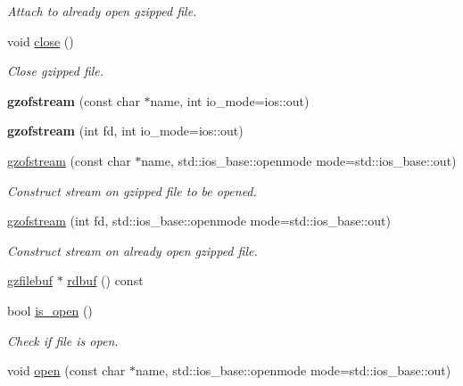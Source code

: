\begin{DoxyCompactItemize}
\begin{DoxyCompactList}\small\item\em Attach to already open gzipped file. \end{DoxyCompactList}\item 
void \hyperlink{classgzofstream_a59e8b01e1c9741085f18ca456c4b8f54}{close} ()
\begin{DoxyCompactList}\small\item\em Close gzipped file. \end{DoxyCompactList}\item 
\mbox{\label{classgzofstream_aad6a405bc9ecfd82cc0861a15e4a6983}} 
{\bfseries gzofstream} (const char $\ast$name, int io\+\_\+mode=ios\+::out)
\item 
\mbox{\label{classgzofstream_a5291a0c4c0e7f6f18ca72ae98f4e4d40}} 
{\bfseries gzofstream} (int fd, int io\+\_\+mode=ios\+::out)
\item 
\hyperlink{classgzofstream_a4334d31aab99f8c9c2277b672a55c78f}{gzofstream} (const char $\ast$name, std\+::ios\+\_\+base\+::openmode mode=std\+::ios\+\_\+base\+::out)
\begin{DoxyCompactList}\small\item\em Construct stream on gzipped file to be opened. \end{DoxyCompactList}\item 
\hyperlink{classgzofstream_aa94d0c8414119a52f2a7f42aa0440941}{gzofstream} (int fd, std\+::ios\+\_\+base\+::openmode mode=std\+::ios\+\_\+base\+::out)
\begin{DoxyCompactList}\small\item\em Construct stream on already open gzipped file. \end{DoxyCompactList}\item 
\hyperlink{classgzfilebuf}{gzfilebuf} $\ast$ \hyperlink{classgzofstream_a2fef74202b114357f41cfeb28f1d2acc}{rdbuf} () const
\item 
bool \hyperlink{classgzofstream_acb1c9c6dccaf41bc5e44c2263ea48de3}{is\+\_\+open} ()
\begin{DoxyCompactList}\small\item\em Check if file is open. \end{DoxyCompactList}\item 
void \hyperlink{classgzofstream_aee3eb31f07eda7f5ad1f60d59ea4b239}{open} (const char $\ast$name, std\+::ios\+\_\+base\+::openmode mode=std\+::ios\+\_\+base\+::out)

\end{DoxyCompactItemize}
